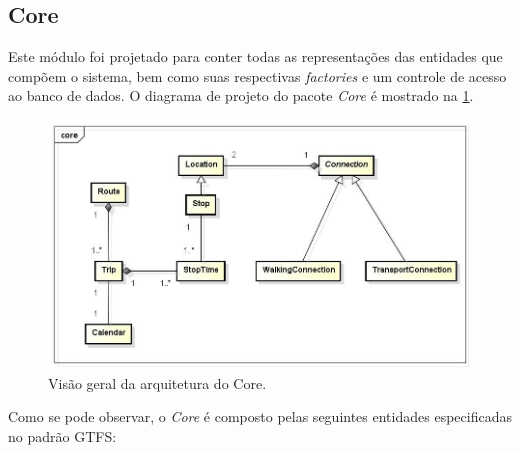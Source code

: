 \subsection{Core}
Este módulo foi projetado para conter todas as representações das entidades que compõem o sistema, bem como suas respectivas \emph{factories} e um controle de acesso ao banco de dados.
O diagrama de projeto do pacote \emph{Core} é mostrado na \ref{fig:core}.

\begin{figure}[!htb]
	\centering
	\includegraphics[width=1\textwidth]{./CoreDiagram.jpg}
	\caption[ImgCore]{Visão geral da arquitetura do Core.}
	\label{fig:core}
\end{figure}

Como se pode observar, o \emph{Core} é composto pelas seguintes entidades especificadas no padrão GTFS:

